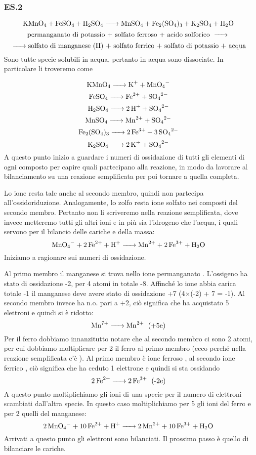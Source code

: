 \subsubsection{\textbf{ES.2}}
$$\ce{KMnO_4 + FeSO_4 + H_2SO_4 -> MnSO_4 + Fe_2(SO_4)_3 + K_2SO_4 + H_2O}$$
$$\text{permanganato di potassio + solfato ferroso + acido solforico \ce{->}}$$
$$\ce{->}\text{solfato di manganese (II) + solfato ferrico + solfato di potassio + acqua}$$
Sono tutte specie solubili in acqua, pertanto in acqua sono dissociate. In particolare li troveremo come

$$\ce{KMnO_4 -> K^+ + MnO_4^-}$$
$$\ce{FeSO_4 -> Fe^{2+} + SO_4^{2-}}$$
$$\ce{H_2SO_4 -> 2 H^+ + SO_4^{2-}}$$
$$\ce{MnSO_4 -> Mn^{2+} + SO_4^{2-}}$$
$$\ce{Fe_2(SO_4)_3 -> 2 Fe^{3+} + 3 SO_4^{2-}}$$
$$\ce{K_2SO_4 -> 2 K^+ + SO_4^{2-}}$$
A questo punto inizio a guardare i numeri di ossidazione di tutti gli elementi di ogni composto per capire quali partecipano alla reazione, in modo da lavorare al bilanciamento su una reazione semplificata per poi tornare a quella completa.

Lo ione  resta tale anche al secondo membro, quindi non partecipa all'ossidoriduzione. Analogamente, lo zolfo resta ione solfato  nei composti del secondo membro. Pertanto non li scriveremo nella reazione semplificata, dove invece metteremo tutti gli altri ioni e in più sia l'idrogeno  che l'acqua, i quali servono per il bilancio delle cariche e della massa:
$$\ce{MnO_4- + 2Fe^2+ + H+ -> Mn^2+ + 2Fe^3+ + H_2O}$$
Iniziamo a ragionare sui numeri di ossidazione.

Al primo membro il manganese si trova nello ione permanganato . L'ossigeno ha stato di ossidazione -2, per 4 atomi in totale -8. Affinché lo ione abbia carica totale -1 il manganese deve avere stato di ossidazione +7 (4$\times$(-2) + 7 = -1). Al secondo membro invece ha n.o. pari a +2, ciò significa che ha acquistato 5 elettroni e quindi si è ridotto:
$$\ce{Mn^7+ -> Mn^2+ \; \text{(+5e)}}$$
Per il ferro dobbiamo innanzitutto notare che al secondo membro ci sono 2 atomi, per cui dobbiamo moltiplicare per 2 il ferro al primo membro (ecco perché nella reazione semplificata c'è ). Al primo membro è ione ferroso , al secondo ione ferrico , ciò significa che ha ceduto 1 elettrone e quindi si sta ossidando
$$\ce{2Fe^2+ -> 2Fe^3+ \; \text{(-2e)}}$$
A questo punto moltiplichiamo gli ioni di una specie per il numero di elettroni scambiati dall'altra specie. In questo caso moltiplichiamo per 5 gli ioni del ferro e per 2 quelli del manganese:
$$\ce{2MnO_4- + 10Fe^2+ + H+ -> 2Mn^2+ + 10Fe^3+ + H_2O}$$
Arrivati a questo punto gli elettroni sono bilanciati. Il prossimo passo è quello di bilanciare le cariche.

